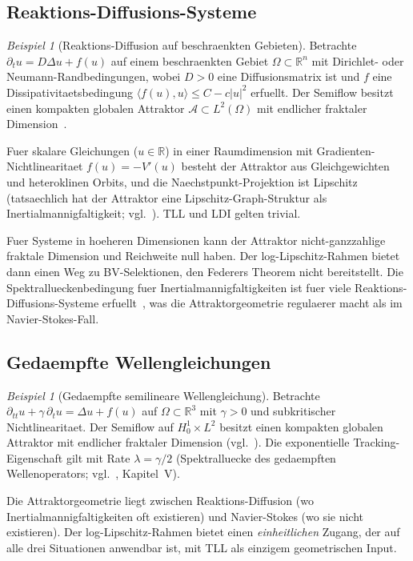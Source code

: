 \documentclass[12pt,a4paper]{article}
\theoremstyle{definition}
\theoremstyle{plain}
\theoremstyle{remark}
\newtheorem{example}[definition]{Beispiel}
\begin{document}
\subsection{Reaktions-Diffusions-Systeme}

\begin{example}[Reaktions-Diffusion auf beschraenkten Gebieten]
\label{ex:RD}
Betrachte $\partial_t u = D\Delta u + f(u)$ auf einem beschraenkten
Gebiet $\Omega \subset \mathbb{R}^n$ mit Dirichlet- oder
Neumann-Randbedingungen, wobei $D > 0$ eine Diffusionsmatrix ist und
$f$ eine Dissipativitaetsbedingung
$\langle f(u), u \rangle \le C - c|u|^2$ erfuellt.  Der Semiflow
besitzt einen kompakten globalen Attraktor
$\mathcal{A} \subset L^2(\Omega)$ mit endlicher fraktaler
Dimension~\cite{Temam1997}.

Fuer skalare Gleichungen ($u \in \mathbb{R}$) in einer Raumdimension
mit Gradienten-Nichtlinearitaet $f(u) = -V'(u)$ besteht der
Attraktor aus Gleichgewichten und heteroklinen Orbits, und die
Naechstpunkt-Projektion ist Lipschitz (tatsaechlich hat der Attraktor
eine Lipschitz-Graph-Struktur als Inertialmannigfaltigkeit;
vgl.~\cite{MalletParetSell1988}).  TLL und LDI gelten trivial.

Fuer Systeme in hoeheren Dimensionen kann der Attraktor
nicht-ganzzahlige fraktale Dimension und Reichweite null haben.
Der log-Lipschitz-Rahmen bietet dann einen Weg zu BV-Selektionen,
den Federers Theorem nicht bereitstellt.  Die Spektrallueckenbedingung
fuer Inertialmannigfaltigkeiten ist fuer viele
Reaktions-Diffusions-Systeme erfuellt~\cite{EdenFoiasNicolaenkoTemam1994},
was die Attraktorgeometrie regulaerer macht als im
Navier-Stokes-Fall.
\end{example}

\subsection{Gedaempfte Wellengleichungen}

\begin{example}[Gedaempfte semilineare Wellengleichung]
\label{ex:wave}
Betrachte $\partial_{tt} u + \gamma\,\partial_t u = \Delta u + f(u)$
auf $\Omega \subset \mathbb{R}^3$ mit $\gamma > 0$ und subkritischer
Nichtlinearitaet.  Der Semiflow auf $H^1_0 \times L^2$ besitzt einen
kompakten globalen Attraktor mit endlicher fraktaler Dimension
(vgl.~\cite{BabinVishik1992}).  Die exponentielle Tracking-Eigenschaft
gilt mit Rate $\lambda = \gamma/2$ (Spektralluecke des gedaempften
Wellenoperators; vgl.~\cite{BabinVishik1992}, Kapitel~V).

Die Attraktorgeometrie liegt zwischen Reaktions-Diffusion
(wo Inertialmannigfaltigkeiten oft existieren) und Navier-Stokes
(wo sie nicht existieren).  Der log-Lipschitz-Rahmen bietet einen
\emph{einheitlichen} Zugang, der auf alle drei Situationen
anwendbar ist, mit TLL als einzigem geometrischen Input.
\end{example}
\end{document}
